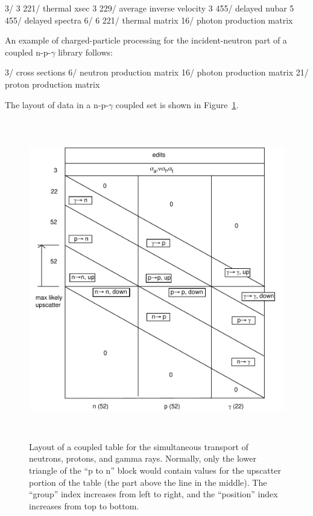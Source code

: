 \small
\begin{ccode}

   3/
   3 221/ thermal xsec
   3 229/ average inverse velocity
   3 455/ delayed nubar
   5 455/ delayed spectra
   6/
   6 221/ thermal matrix
   16/ photon production matrix

\end{ccode}
\normalsize

\noindent
An example of charged-particle processing for the incident-neutron
part of a coupled n-p-$\gamma$ library follows:

\small
\begin{ccode}

   3/ cross sections
   6/ neutron production matrix
   16/ photon production matrix
   21/ proton production matrix

\end{ccode}
\normalsize

\noindent
The layout of data in a n-p-$\gamma$ coupled set is shown in
Figure~\ref{npg}.

\begin{figure}[thb]\centering
\includegraphics[keepaspectratio, height=5.5in, angle=0]{figs/groupr8}
\caption[Coupled neutron-proton-photon table]{Layout of a coupled table for
 the simultaneous transport of neutrons, protons, and gamma rays.  Normally,
 only the lower triangle of the ``p to n'' block would contain values for the
 upscatter portion of the table (the part above the line in the middle).  The
 ``group'' index increases from left to right, and the ``position'' index
 increases from top to bottom.}
\label{npg}
\end{figure}

